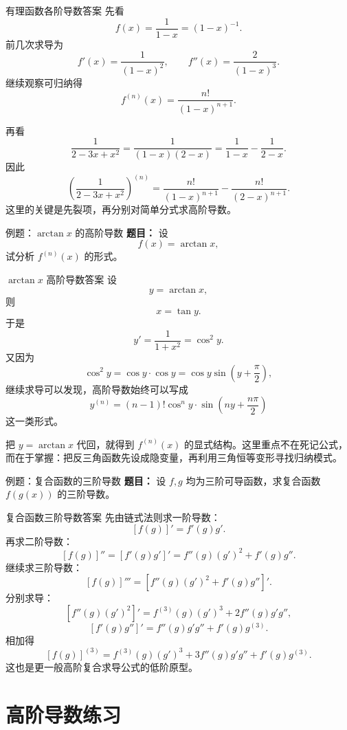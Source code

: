 ﻿\documentclass[aspectratio=169,11pt]{ctexbeamer}
\begin{document}
\begin{frame}{有理函数各阶导数答案}
\small
先看
\[
f(x)=\frac{1}{1-x}=(1-x)^{-1}.
\]
前几次求导为
\[
f'(x)=\frac{1}{(1-x)^2},\qquad
f''(x)=\frac{2}{(1-x)^3}.
\]
继续观察可归纳得
\[
f^{(n)}(x)=\frac{n!}{(1-x)^{n+1}}.
\]

再看
\[
\frac{1}{2-3x+x^2}=\frac{1}{(1-x)(2-x)}
=\frac{1}{1-x}-\frac{1}{2-x}.
\]
因此
\[
\left(\frac{1}{2-3x+x^2}\right)^{(n)}
=\frac{n!}{(1-x)^{n+1}}-\frac{n!}{(2-x)^{n+1}}.
\]
这里的关键是先裂项，再分别对简单分式求高阶导数。
\end{frame}

\begin{frame}{例题：$\arctan x$ 的高阶导数}
\small
\textbf{题目：} 设
\[
f(x)=\arctan x,
\]
试分析 $f^{(n)}(x)$ 的形式。
\end{frame}

\begin{frame}[allowframebreaks]{$\arctan x$ 高阶导数答案}
\small
设
\[
y=\arctan x,
\]
则
\[
x=\tan y.
\]
于是
\[
y'=\frac1{1+x^2}=\cos^2 y.
\]
又因为
\[
\cos^2 y=\cos y\cdot \cos y=\cos y\sin\left(y+\frac{\pi}{2}\right),
\]
继续求导可以发现，高阶导数始终可以写成
\[
y^{(n)}=(n-1)!\cos^n y\cdot \sin\left(ny+\frac{n\pi}{2}\right)
\]
这一类形式。

\vspace{0.4em}
把 $y=\arctan x$ 代回，就得到 $f^{(n)}(x)$ 的显式结构。这里重点不在死记公式，而在于掌握：\alert{把反三角函数先设成隐变量，再利用三角恒等变形寻找归纳模式}。
\end{frame}

\begin{frame}{例题：复合函数的三阶导数}
\small
\textbf{题目：} 设 $f,g$ 均为三阶可导函数，求复合函数 $f(g(x))$ 的三阶导数。
\end{frame}

\begin{frame}{复合函数三阶导数答案}
\small
先由链式法则求一阶导数：
\[
[f(g)]'=f'(g)g'.
\]
再求二阶导数：
\[
[f(g)]''=[f'(g)g']'=f''(g)(g')^2+f'(g)g''.
\]
继续求三阶导数：
\[
[f(g)]'''
=\left[f''(g)(g')^2+f'(g)g''\right]'.
\]
分别求导：
\[
\left[f''(g)(g')^2\right]'=f^{(3)}(g)(g')^3+2f''(g)g'g'',
\]
\[
\left[f'(g)g''\right]'=f''(g)g'g''+f'(g)g^{(3)}.
\]
相加得
\[
[f(g)]^{(3)}=f^{(3)}(g)(g')^3+3f''(g)g'g''+f'(g)g^{(3)}.
\]
这也是更一般高阶复合求导公式的低阶原型。
\end{frame}

\section{高阶导数练习}
\end{document}
